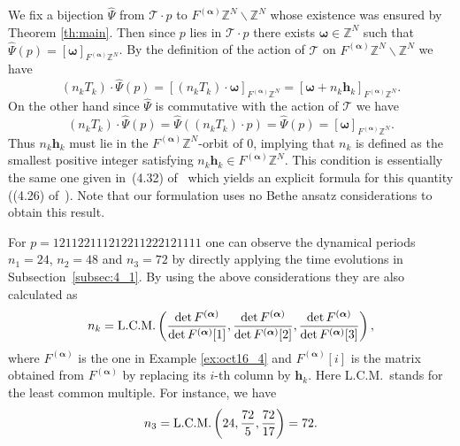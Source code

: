 \documentclass[pdftex]{sigma}
\newcommand{\Z}{{\mathbb Z}}
\newcommand\bom{\boldsymbol{\omega}}
\newcommand\boa{\boldsymbol{\alpha}}
\begin{document}
We f\/ix a bijection $\widehat{\Psi}$ from ${\mathcal T} \cdot p$ to $F^{(\boa)} \Z^N \backslash \Z^N$
whose existence was ensured by Theorem \ref{th:main}.
Then since $p$ lies in ${\mathcal T} \cdot p$ there exists $\bom \in \Z^N$ such that $\widehat{\Psi} (p) =  [\bom]_{F^{(\boa)} \Z^N}$.
By the def\/inition of the action of ${\mathcal T}$ on $F^{(\boa)} \Z^N \backslash \Z^N$ we have
\begin{displaymath}
(n_k T_k) \cdot \widehat{\Psi} (p) = [(n_k T_k) \cdot \bom ]_{F^{(\boa)} \Z^N}
= [\bom + n_k \boldsymbol{h}_k ]_{F^{(\boa)} \Z^N}.
\end{displaymath}
On the other hand since $\widehat{\Psi}$ is commutative with the action of ${\mathcal T}$ we have
\begin{displaymath}
(n_k T_k) \cdot \widehat{\Psi} (p) = \widehat{\Psi} ((n_k T_k) \cdot p) =  \widehat{\Psi} (p)= [\bom]_{F^{(\boa)} \Z^N}.
\end{displaymath}
Thus $n_k \boldsymbol{h}_k$ must lie in the $F^{(\boa)} \Z^N$-orbit of $0$, implying that
$n_k$ is def\/ined as the smallest positive integer satisfying $n_k \boldsymbol{h}_k \in F^{(\boa)} \Z^N$.
This condition is essentially the same one given in~(4.32) of~\cite{KTT} which yields an explicit formula for this quantity ((4.26) of~\cite{KTT}).
Note that our formulation uses no Bethe ansatz considerations to obtain this result.
\begin{example}\label{ex:oct16_5}
For $p=121122111212211222121111$ one can observe
the dynamical periods $n_1 = 24$, $n_2 = 48$ and $n_3=72$ by directly applying the time evolutions
in Subsection~\ref{subsec:4_1}.
By using the above considerations they are also calculated as
\begin{equation*}
n_k = {\rm L.C.M.} \left( \frac{\det  F^{(\boa)}}{\det  F^{(\boa)}[1]},
\frac{\det  F^{(\boa)}}{\det  F^{(\boa)}[2]}, \frac{\det  F^{(\boa)}}{\det  F^{(\boa)}[3]} \right),
\end{equation*}
where $F^{(\boa)}$ is the one in Example \ref{ex:oct16_4} and
$F^{(\boa)}[i]$ is the matrix obtained from $F^{(\boa)}$ by replacing its $i$-th column by $\boldsymbol{h}_k$.
Here L.C.M.~stands for the least common multiple.
For instance, we have
\begin{equation*}
n_3 = {\rm L.C.M.} \left( 24,
\frac{72}{5}, \frac{72}{17} \right) = 72.
\end{equation*}
\end{example}
\end{document}
